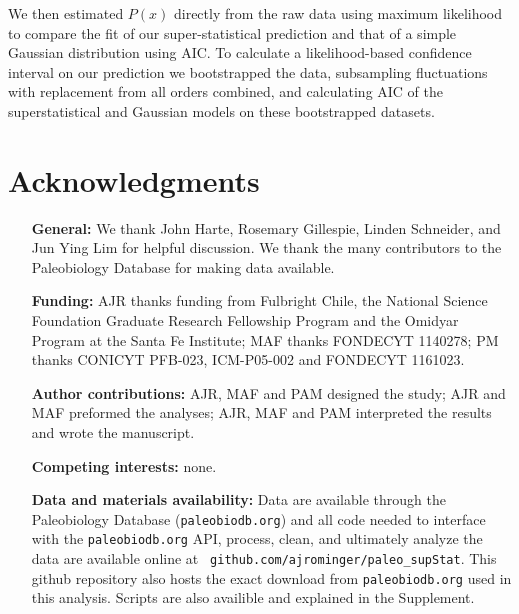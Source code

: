 \documentclass[12pt]{article}
\begin{document}
We then estimated $P(x)$ directly from the raw data using maximum
likelihood to compare the fit of our super-statistical prediction and
that of a simple Gaussian distribution using AIC. To calculate a
likelihood-based confidence interval on our prediction we bootstrapped
the data, subsampling fluctuations with replacement from all orders
combined, and calculating AIC of the superstatistical and Gaussian
models on these bootstrapped datasets.





\section*{Acknowledgments}
\begin{itemize}
\item[{\bf General:}] We thank John Harte, Rosemary Gillespie, Linden
  Schneider, and Jun Ying Lim for helpful discussion. We thank the
  many contributors to the Paleobiology Database for making data
  available.
\item[{\bf Funding:}] AJR thanks funding from Fulbright Chile, the
  National Science Foundation Graduate Research Fellowship Program and
  the Omidyar Program at the Santa Fe Institute; MAF thanks FONDECYT
  1140278; PM thanks CONICYT PFB-023, ICM-P05-002 and FONDECYT
  1161023.
\item[{\bf Author contributions:}] AJR, MAF and PAM designed the
  study; AJR and MAF preformed the analyses; AJR, MAF and PAM
  interpreted the results and wrote the manuscript.
\item[{\bf Competing interests:}] none.
\item[{\bf Data and materials availability:}] Data are available
  through the Paleobiology Database ({\tt paleobiodb.org}) and all
  code needed to interface with the {\tt paleobiodb.org} API, process,
  clean, and ultimately analyze the data are available online at {\tt
    github.com/ajrominger/paleo\_supStat}. This github repository also
  hosts the exact download from {\tt paleobiodb.org} used in this
  analysis. Scripts are also availible and explained in the
  Supplement.
\end{itemize}


\clearpage

\newcommand{\beginsupplement}{%
  \setcounter{table}{0}
  \renewcommand{\thetable}{S\arabic{table}}%
  \setcounter{figure}{0}
  \renewcommand{\thefigure}{S\arabic{figure}}%
  \setcounter{section}{0}
  \renewcommand{\thesection}{S\arabic{section}}%
}
\end{document}

